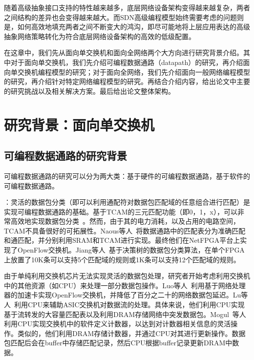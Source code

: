 随着高级抽象接口支持的特性越来越多，底层网络设备架构变得越来越复杂，两者之间结构的差异也会变得越来越大。而SDN高级编程模型始终需要考虑的问题则是，如何高效地填充两者之间不断变大的鸿沟，即尽可能地将上层应用表达的高级抽象网络策略转化为符合底层网络设备架构的高效的低级配置。

在这章中，我们先从面向单交换机和面向全网络两个大方向进行研究背景介绍。其中对于面向单交换机，我们先介绍可编程数据通路（datapath）的研究，再介绍面向单交换机编程模型的研究；对于面向全网络，我们先介绍面向一般网络编程模型的研究，再介绍针对特定网络编程模型的研究。再结合介绍内容，给出论文中主要的研究挑战以及相关解决方案。最后给出论文整体架构。


\section{研究背景：面向单交换机}

\subsection{可编程数据通路的研究背景}

可编程数据通路的研究可以分为两大类：基于硬件的可编程数据通路，基于软件的可编程数据通路。

：灵活的数据包分类（即可以利用通配符对数据包匹配域的任意组合进行匹配）是实现可编程数据通路的基础。基于TCAM的三元匹配功能（即0，1，x），可以非常高效地实现数据包分类~\cite{yu2005efficient,lakshminarayanan2005algorithms,song2005efficient}。然而，由于其的电力消耗，以及占用的电路空间，TCAM不具备很好的可拓展性。Naous等人~\cite{naous2008implementing}将数据通路中的匹配表分为准确匹配和通匹配，并分别利用SRAM和TCAM进行实现。最终他们在NetFPGA平台上实现了OpenFlow交换机。Jiang等人~\cite{jiang2011scalable}基于决策树的数据包分类算法，在单个FPGA上放置了10K条可以支持5个匹配域的规则或1K条可以支持12个匹配域的规则。

由于单纯利用交换机芯片无法实现灵活的数据包处理，研究者开始考虑利用交换机中的其他资源（如CPU）来处理一部分数据包操作。Luo等人~\cite{luo2009accelerating}利用基于网络处理器的加速卡实现OpenFlow交换机，并降低了百分之二十的网络数据包延迟。Lu等人~\cite{lu2012using}利用CPU来辅助ASIC交换机对数据流的处理。具体来说，他们利用CPU实现基于流转发的大容量匹配表以及利用DRAM存储网络中突发数据包。Mogul~\cite{mogul2012hey}等人利用CPU实现交换机中的软件定义计数器，以达到对计数器相关信息的灵活操作。类似的，他们利用DRAM存储计数器，并通过CPU对其进行更新操作。数据包匹配后会在buffer中存储匹配记录，然后CPU根据buffer记录更新DRAM中数据。

